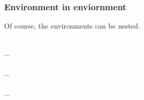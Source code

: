 \begin{frame}
	\frametitle{Environment in enviornment}
	Of course, the environments can be nested.\\
	\begin{example}
		\\
		\qquad ...\\
		\qquad{}\\
		\qquad\qquad ...\\
		\qquad{}\\
		\qquad ...\\
		\\
	\end{example}
\end{frame}




